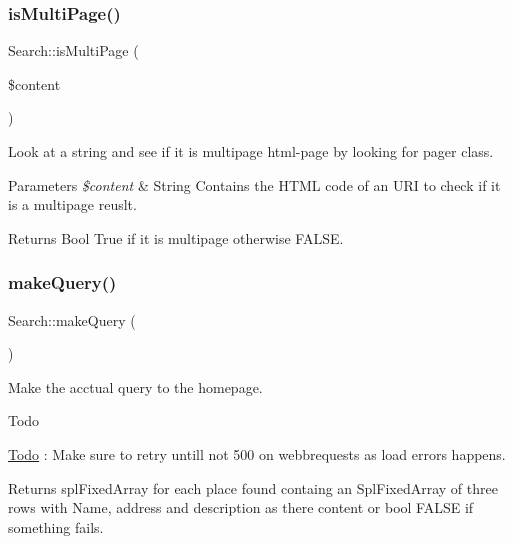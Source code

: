 \subsubsection{\texorpdfstring{is\+Multi\+Page()}{isMultiPage()}}
{\footnotesize\ttfamily Search\+::is\+Multi\+Page (\begin{DoxyParamCaption}\item[{}]{\$content }\end{DoxyParamCaption})\hspace{0.3cm}{\ttfamily [private]}}



Look at a string and see if it is multipage html-\/page by looking for pager class. 


\begin{DoxyParams}{Parameters}
{\em \$content} & String Contains the H\+T\+ML code of an U\+RI to check if it is a multipage reuslt.\\
\hline
\end{DoxyParams}
\begin{DoxyReturn}{Returns}
Bool True if it is multipage otherwise F\+A\+L\+SE. 
\end{DoxyReturn}
\hypertarget{class_search_aab0de7f1b256ebfc720a5c9a26c7a5e4}{}\label{class_search_aab0de7f1b256ebfc720a5c9a26c7a5e4} 
\subsubsection{\texorpdfstring{make\+Query()}{makeQuery()}}
{\footnotesize\ttfamily Search\+::make\+Query (\begin{DoxyParamCaption}{ }\end{DoxyParamCaption})\hspace{0.3cm}{\ttfamily [private]}}



Make the acctual query to the homepage. 

\begin{DoxyRefDesc}{Todo}
\item[\hyperlink{todo__todo000001}{Todo}]\+: Make sure to retry untill not 500 on webbrequests as load errors happens.\end{DoxyRefDesc}


\begin{DoxyReturn}{Returns}
spl\+Fixed\+Array for each place found containg an Spl\+Fixed\+Array of three rows with Name, address and description as there content or bool F\+A\+L\+SE if something fails. 
\end{DoxyReturn}



